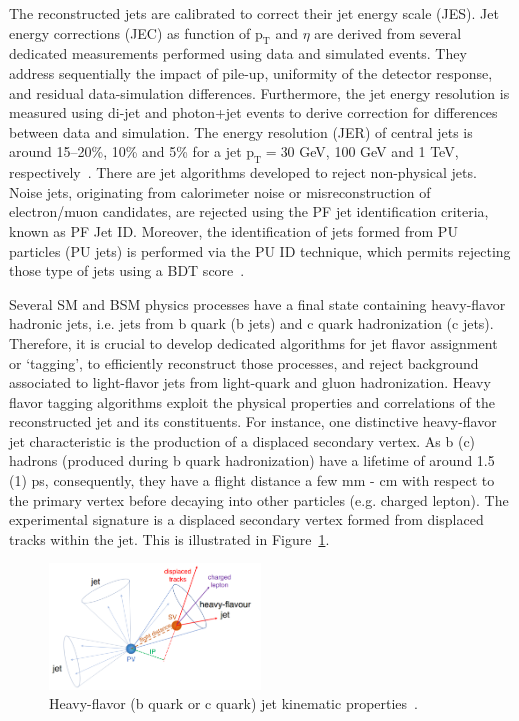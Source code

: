 The reconstructed jets are calibrated to correct their jet energy scale (JES). Jet energy corrections (JEC) as function of $\mathrm{p_{T}}$ and $\eta$ are derived from several dedicated measurements performed using data and simulated events. They address sequentially the impact of pile-up, uniformity of the detector response, and residual data-simulation differences. Furthermore, the jet energy resolution is measured using di-jet and photon+jet events to derive correction for differences between data and simulation. The energy resolution (JER) of central jets is around 15--20\%, 10\% and 5\% for a jet $\mathrm{p_{T} = 30}$ GeV, 100 GeV and 1 TeV, respectively~\cite{CMS:2016lmd}. 
There are jet algorithms developed to reject non-physical jets. Noise jets, originating from calorimeter noise or misreconstruction of electron/muon candidates, are rejected using the PF jet identification criteria, known as PF Jet ID. Moreover, the identification of jets formed from PU particles (PU jets) is performed via the PU ID technique, which permits rejecting those type of jets using a BDT score~\cite{CMS:2017wyc}. 

Several SM and BSM physics processes have a final state containing heavy-flavor hadronic jets, i.e. jets from b quark (b jets) and c quark hadronization (c jets). Therefore, it is crucial to develop dedicated algorithms for jet flavor assignment or `tagging', to efficiently reconstruct those processes, and reject background associated to light-flavor jets from light-quark and gluon hadronization. Heavy flavor tagging algorithms exploit the physical properties and correlations of the reconstructed jet and its constituents. For instance, one distinctive heavy-flavor jet characteristic is the production of a displaced secondary vertex. As b (c) hadrons (produced during b quark hadronization) have a lifetime of around 1.5 (1) ps, consequently, they have a flight distance a few mm - cm with respect to the primary vertex before decaying into other particles (e.g. charged lepton). The experimental signature is a displaced secondary vertex formed from displaced tracks within the jet. This is illustrated in Figure~\ref{fig:bjet}.

\begin{figure}[htp!]
\centering
\includegraphics[width=0.5\textwidth]{Figures/Apparatus/bjet.png}
\caption[Heavy-flavour (b quark or c quark) jet kinematic properties]{Heavy-flavor (b quark or c quark) jet kinematic properties~\cite{cmsbtagging13tev}.}
\label{fig:bjet}
\end{figure}

